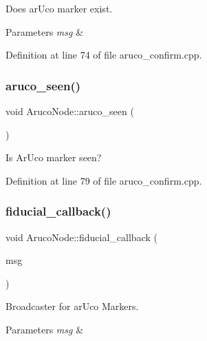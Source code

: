 Does ar\+Uco marker exist. 


\begin{DoxyParams}{Parameters}
{\em msg} & \\
\hline
\end{DoxyParams}


Definition at line 74 of file aruco\+\_\+confirm.\+cpp.

\mbox{\label{class_aruco_node_a21fe5af1a16e884424a4065ca6dd608f}} 
\subsubsection{\texorpdfstring{aruco\+\_\+seen()}{aruco\_seen()}}
{\footnotesize\ttfamily void Aruco\+Node\+::aruco\+\_\+seen (\begin{DoxyParamCaption}{ }\end{DoxyParamCaption})}



Is Ar\+Uco marker seen? 



Definition at line 79 of file aruco\+\_\+confirm.\+cpp.

\mbox{\label{class_aruco_node_af68c583d73a36c483d28b96a6fd22713}} 
\subsubsection{\texorpdfstring{fiducial\+\_\+callback()}{fiducial\_callback()}}
{\footnotesize\ttfamily void Aruco\+Node\+::fiducial\+\_\+callback (\begin{DoxyParamCaption}\item[{const fiducial\+\_\+msgs\+::\+Fiducial\+Transform\+Array\+::\+Const\+Ptr \&}]{msg }\end{DoxyParamCaption})}



Broadcaster for ar\+Uco Markers. 


\begin{DoxyParams}{Parameters}
{\em msg} & \\
\hline
\end{DoxyParams}


